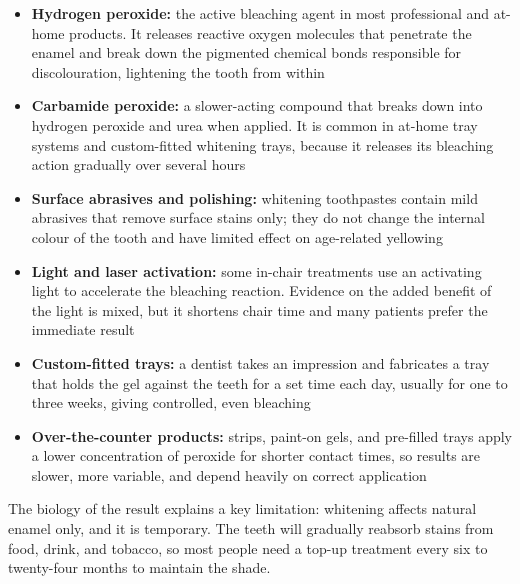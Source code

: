 \begin{itemize}
    \item \textbf{Hydrogen peroxide:} the active bleaching agent in most professional and at-home products. It releases reactive oxygen molecules that penetrate the enamel and break down the pigmented chemical bonds responsible for discolouration, lightening the tooth from within
    \item \textbf{Carbamide peroxide:} a slower-acting compound that breaks down into hydrogen peroxide and urea when applied. It is common in at-home tray systems and custom-fitted whitening trays, because it releases its bleaching action gradually over several hours
    \item \textbf{Surface abrasives and polishing:} whitening toothpastes contain mild abrasives that remove surface stains only; they do not change the internal colour of the tooth and have limited effect on age-related yellowing
    \item \textbf{Light and laser activation:} some in-chair treatments use an activating light to accelerate the bleaching reaction. Evidence on the added benefit of the light is mixed, but it shortens chair time and many patients prefer the immediate result
    \item \textbf{Custom-fitted trays:} a dentist takes an impression and fabricates a tray that holds the gel against the teeth for a set time each day, usually for one to three weeks, giving controlled, even bleaching
    \item \textbf{Over-the-counter products:} strips, paint-on gels, and pre-filled trays apply a lower concentration of peroxide for shorter contact times, so results are slower, more variable, and depend heavily on correct application
\end{itemize}

The biology of the result explains a key limitation: whitening affects natural enamel only, and it is temporary. The teeth will gradually reabsorb stains from food, drink, and tobacco, so most people need a top-up treatment every six to twenty-four months to maintain the shade.

